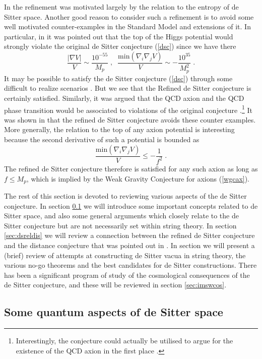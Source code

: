 \documentclass[11pt,a4paper]{article}
\numberwithin{equation}{section}
\numberwithin{table}{section}\setlength{\multlinegap}{25pt}
\newcommand{\be}{\begin{equation}}
\newcommand{\ee}{\end{equation}}
\begin{document}
{In \cite{Ooguri:2018wrx} the refinement was motivated largely by the relation to the entropy of de Sitter space. Another good reason to consider such a refinement is to avoid some well motivated counter-examples in the Standard Model and extensions of it. In particular, in \cite{Denef:2018etk} it was pointed out that the top of the Higgs potential would strongly violate the original de Sitter conjecture (\ref{dsc}) since we have there
\be
\frac{\left|\nabla V \right|  }{V} \sim \frac{10^{-55}}{M_p} \;,\;\; \frac{\mathrm{min}\left(\nabla_i \nabla_j V \right) }{V} \sim - \frac{10^{35}}{M_p^2}\;.
\ee
It may be possible to satisfy the de Sitter conjecture (\ref{dsc}) through some difficult to realize scenarios \cite{Denef:2018etk}. But we see that the Refined de Sitter conjecture is certainly satisfied. Similarly, it was argued that the QCD axion and the QCD phase transition would be associated to violations of the original conjecture \cite{Murayama:2018lie,Choi:2018rze}.\footnote{Interestingly, the conjecture could actually be utilised to argue for the existence of the QCD axion in the first place \cite{Dvali:2018dce}.} It was shown in \cite{Ooguri:2018wrx} that the refined de Sitter conjecture avoids these counter examples. More generally, the relation to the top of any axion potential is interesting because the second derivative of such a potential is bounded as
\be
\frac{\mathrm{min}\left(\nabla_i \nabla_j V \right) }{V} \leq -\frac{1}{f^2} \;.
\ee
The refined de Sitter conjecture therefore is satisfied for any such axion as long as $f \leq M_p$, which is implied by the Weak Gravity Conjecture for axions (\ref{wgcax}). 

The rest of this section is devoted to reviewing various aspects of the de Sitter conjecture. In section \ref{sec:qaods} we will introduce some important concepts related to de Sitter space, and also some general arguments which closely relate to the de Sitter conjecture but are not necessarily set within string theory. In section \ref{sec:dsreldis} we will review a connection between the refined de Sitter conjecture and the distance conjecture that was pointed out in \cite{Ooguri:2018wrx}. In section we will present a (brief) review of attempts at constructing de Sitter vacua in string theory, the various no-go theorems and the best candidates for de Sitter constructions. There has been a significant program of study of the cosmological consequences of the de Sitter conjecture, and these will be reviewed in section \ref{sec:imswcos}.

\subsection{Some quantum aspects of de Sitter space}
\label{sec:qaods}

}
\end{document}
